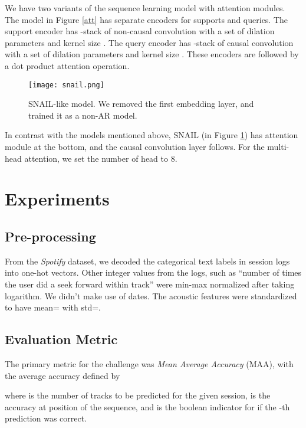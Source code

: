 We have two variants of the sequence learning model with attention modules. The model in Figure \ref{att} has separate encoders for supports and queries. The support encoder has -stack of non-causal convolution with a set of dilation parameters  and kernel size . The query encoder has -stack of causal convolution with a set of dilation parameters   and kernel size . These encoders are followed by a dot product attention operation\cite{vaswani2017attention}. 

\begin{figure}
\texttt{[image: snail.png]}
\caption{SNAIL\cite{snail}-like model. We removed the first embedding layer, and trained it as a non-AR model.}
\label{snailf}
\end{figure}

In contrast with the models mentioned above, SNAIL\cite{snail} (in Figure \ref{snailf}) has attention module at the bottom, and the causal convolution layer follows. For the multi-head attention, we set the number of head to 8.  

\section{Experiments}
\subsection{Pre-processing}
From the {\it Spotify} dataset\cite{brost2019music}, we decoded the categorical text labels in session logs into one-hot vectors. Other integer values from the logs, such as ``number of times the user did a seek forward within track'' were min-max normalized after taking logarithm. We didn't make use of dates. The acoustic  features were standardized to have mean= with std=.
\subsection{Evaluation Metric}
The primary metric for the challenge was {\it Mean Average Accuracy} (MAA), with the average accuracy defined by
 
where  is the number of tracks to be predicted for the given session,  is the accuracy at position  of the sequence, and  is the boolean indicator for if the -th prediction was correct.

